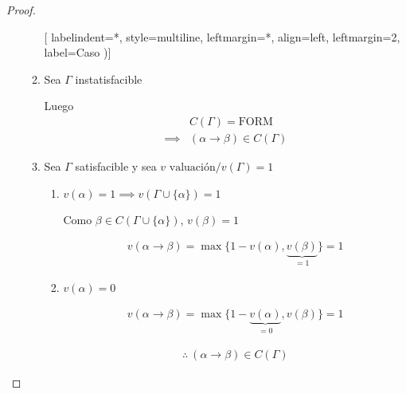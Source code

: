 \begin{proof}
\begin{itemize}
            \begin{enumerate}[%
                            labelindent=*,
                            style=multiline,
                            leftmargin=*,
                            align=left,
                            leftmargin=2\parindent,
                            label=Caso \arabic*)]
            
            \item Sea $\Gamma$ instatisfacible

                Luego
                \begin{align*}
                    \phantom{\implies}& C(\Gamma) = \mathrm{FORM} \\
                    \implies& (\alpha \to \beta) \in C(\Gamma)
                \end{align*}


            \item Sea $\Gamma$ satisfacible y sea $v \text{ valuación}/ v(\Gamma)=1$

            \begin{enumerate}[%
                            labelindent=*,
                            style=multiline,
                            leftmargin=*,
                            align=left,
                            leftmargin=2\parindent,
                            label=Caso \alph*)]
                \item $v(\alpha)=1 \implies v(\Gamma \cup \{ \alpha \})=1$

                    Como $\beta \in C(\Gamma \cup \{ \alpha \})$, $v(\beta)=1$

                    \begin{gather*}
                        v(\alpha\to\beta)
                        = \max \{ 1-v(\alpha), \underbrace{v(\beta)}_{=1}\}
                        = 1
                    \end{gather*}

                \item $v(\alpha)=0$

                    \begin{gather*}
                        v(\alpha\to\beta) 
                        =\max \{ 1-\underbrace{v(\alpha)}_{=0}, v(\beta)\}
                        = 1
                    \end{gather*}


                    \begin{gather*}
                        \therefore ~ (\alpha \to \beta) \in C(\Gamma)
                    \end{gather*}
            \end{enumerate}

            \end{enumerate}
    \end{itemize}
\end{proof}


